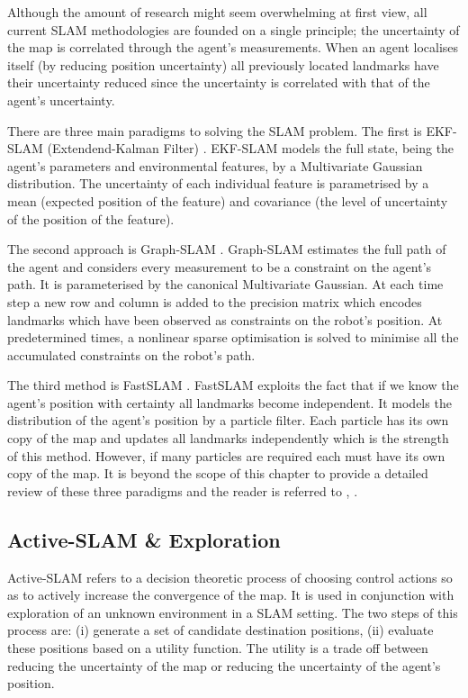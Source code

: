 
Although the amount of research might seem overwhelming at first view, all current SLAM methodologies are founded on a single principle; 
the uncertainty of the map is correlated through the agent's measurements. When an agent localises itself (by reducing position uncertainty)
all previously located landmarks have their uncertainty reduced since the uncertainty is correlated with that of the agent's uncertainty.


There are three main paradigms to solving the SLAM problem. The first is EKF-SLAM (Extendend-Kalman Filter) \cite{SLAM_part1}.
EKF-SLAM models the full state, being the agent's parameters and environmental features, by a Multivariate Gaussian distribution. 
The uncertainty of each individual feature is parametrised by a mean (expected position of the feature) and covariance 
(the level of uncertainty of the position of the feature).

The second approach is Graph-SLAM \cite{TutGraphSLAM}. Graph-SLAM estimates the full path of the agent and considers every measurement to 
be a constraint on the agent's path. It is parameterised by the canonical Multivariate Gaussian. At each time step a new row and column 
is added to the precision matrix which encodes landmarks which have been observed as constraints on the robot's position.
At predetermined times, a nonlinear sparse optimisation is solved to minimise all the accumulated constraints on the robot's path.

The third method is FastSLAM \cite{FastSLAM}. FastSLAM exploits the fact that if we know the agent's position with 
certainty all landmarks become independent. It models the distribution of the agent's position by a particle filter. Each particle
has its own copy of the map and updates all landmarks independently which is the strength of this method. 
However, if many particles are required each must have its own copy of the map. 
It is beyond the scope of this chapter to provide a detailed review of these  three paradigms and the reader is referred 
to \cite{Thrun_Burgard_Fox_2005}, \cite{SLAM_HBR}.

\subsection{Active-SLAM \& Exploration}

Active-SLAM refers to a decision theoretic process of choosing control actions so as to actively 
increase the convergence of the map. It is used in conjunction with exploration of an unknown environment
in a SLAM setting. The two steps of this process are: (i) generate a set of 
candidate destination positions, (ii) evaluate these positions based on a utility function. The utility  
is a trade off between reducing the uncertainty of the map or reducing the uncertainty
of the agent's position.

